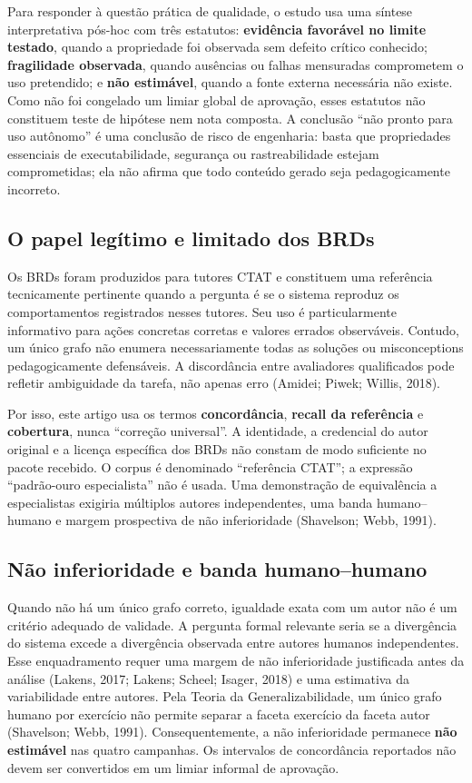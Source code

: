 \documentclass[11pt,a4paper]{article}
\begin{document}
Para responder à questão prática de qualidade, o estudo usa uma síntese interpretativa pós-hoc com três estatutos: \textbf{evidência favorável no limite testado}, quando a propriedade foi observada sem defeito crítico conhecido; \textbf{fragilidade observada}, quando ausências ou falhas mensuradas comprometem o uso pretendido; e \textbf{não estimável}, quando a fonte externa necessária não existe. Como não foi congelado um limiar global de aprovação, esses estatutos não constituem teste de hipótese nem nota composta. A conclusão ``não pronto para uso autônomo'' é uma conclusão de risco de engenharia: basta que propriedades essenciais de executabilidade, segurança ou rastreabilidade estejam comprometidas; ela não afirma que todo conteúdo gerado seja pedagogicamente incorreto.

\subsection{O papel legítimo e limitado dos BRDs}

Os BRDs foram produzidos para tutores CTAT e constituem uma referência tecnicamente pertinente quando a pergunta é se o sistema reproduz os comportamentos registrados nesses tutores. Seu uso é particularmente informativo para ações concretas corretas e valores errados observáveis. Contudo, um único grafo não enumera necessariamente todas as soluções ou misconceptions pedagogicamente defensáveis. A discordância entre avaliadores qualificados pode refletir ambiguidade da tarefa, não apenas erro (Amidei; Piwek; Willis, 2018).

Por isso, este artigo usa os termos \textbf{concordância}, \textbf{recall da referência} e \textbf{cobertura}, nunca ``correção universal''. A identidade, a credencial do autor original e a licença específica dos BRDs não constam de modo suficiente no pacote recebido. O corpus é denominado ``referência CTAT''; a expressão ``padrão-ouro especialista'' não é usada. Uma demonstração de equivalência a especialistas exigiria múltiplos autores independentes, uma banda humano--humano e margem prospectiva de não inferioridade (Shavelson; Webb, 1991).

\subsection{Não inferioridade e banda humano--humano}

Quando não há um único grafo correto, igualdade exata com um autor não é um critério adequado de validade. A pergunta formal relevante seria se a divergência do sistema excede a divergência observada entre autores humanos independentes. Esse enquadramento requer uma margem de não inferioridade justificada antes da análise (Lakens, 2017; Lakens; Scheel; Isager, 2018) e uma estimativa da variabilidade entre autores. Pela Teoria da Generalizabilidade, um único grafo humano por exercício não permite separar a faceta exercício da faceta autor (Shavelson; Webb, 1991). Consequentemente, a não inferioridade permanece \textbf{não estimável} nas quatro campanhas. Os intervalos de concordância reportados não devem ser convertidos em um limiar informal de aprovação.
\end{document}
